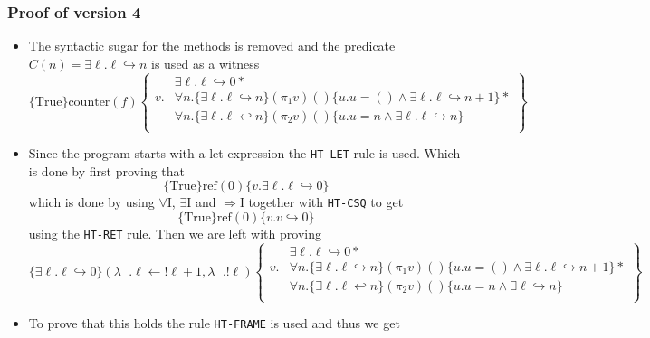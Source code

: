 \subsubsection{Proof of version 4}
\begin{itemize}
	\item The syntactic sugar for the methods is removed and the predicate $C(n) = \exists \ell . \ell \hookrightarrow n$ is used as a witness
  \[
  \{\text{True} \} \text{counter}(f) \left\{
    \begin{split} 
         & \exists \ell. \ell \hookrightarrow 0  * \\
      v. & \forall n. \{\exists \ell. \ell \hookrightarrow n\} (\pi_1 v)() \{u.u=() \land \exists \ell. \ell \hookrightarrow n+1\} * \\
         & \forall n. \{\exists \ell. \ell \hookleftarrow n\} (\pi_2 v) () \{u.u=n \land \exists \ell. \ell \hookrightarrow n\}  \\
    \end{split}
    \right\}
  \]
  \item Since the program starts with a let expression the \texttt{HT-LET} rule is used. Which is done by first proving that 
  \begin{equation*}
    \{\text{True} \} \text{ref}(0) \{v. \exists \ell. \ell \hookrightarrow 0\}
  \end{equation*}
  which is done by using $\forall$I, $\exists$I and $\Rightarrow$I together with \texttt{HT-CSQ} to get
  \begin{equation*}
    \{\text{True} \} \text{ref}(0) \{v. v \hookrightarrow 0\}
  \end{equation*}
  using the \texttt{HT-RET} rule. Then we are left with proving
  \begin{equation*}
    \{\exists \ell . \ell \hookrightarrow 0 \}\left(\lambda_{-}. \ell \leftarrow !\ell+1, \lambda_{-}. ! \ell\right) \left\{
    \begin{split} 
         & \exists \ell. \ell \hookrightarrow 0  * \\
      v. & \forall n. \{\exists \ell. \ell \hookrightarrow n\} (\pi_1 v)() \{u.u=() \land \exists \ell. \ell \hookrightarrow n+1\} * \\
         & \forall n. \{\exists \ell. \ell \hookleftarrow n\} (\pi_2 v) () \{u.u=n \land \exists \ell \hookrightarrow n\}  \\
    \end{split}
    \right\}
  \end{equation*}
  \item To prove that this holds the rule \texttt{HT-FRAME} is used and thus we get

\end{itemize}
